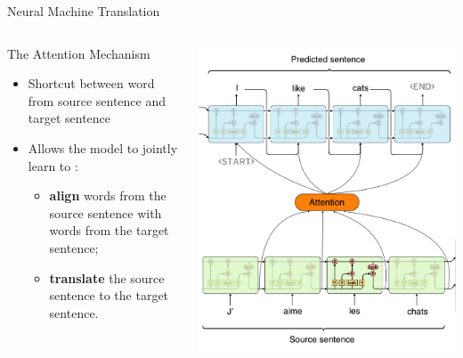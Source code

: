 \documentclass[aspectratio=169]{beamer}
\begin{document}
\begin{frame}{Neural Machine Translation}
\begin{columns}
\begin{column}{0.5\textwidth}
   \centering
   The Attention Mechanism \cite{bahdanau2014neural, luong2015effective}
   
   \vspace{.5cm}
   \raggedright
   \begin{itemize}
   	\item Shortcut between word from source sentence and target sentence
	\vspace{.5cm}
	\item Allows the model to jointly learn to :
	\begin{itemize}
		\item \textbf{align} words from the source sentence with words from the target sentence;
		\item \textbf{translate} the source sentence to the target sentence.
	\end{itemize}
   \end{itemize}
\end{column}
\begin{column}{0.5\textwidth}  %
    \begin{center}
    \vspace{-1.9cm}
    \includegraphics[height=\paperheight]{figures/seq2seq_attn}
    \end{center}
\end{column}
\end{columns}
\end{frame}
\end{document}
